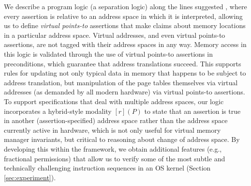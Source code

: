 We describe a program logic (a separation logic) along the lines suggested , where every assertion is relative
to an address space in which it is interpreted, allowing us to define \emph{virtual points-to} assertions that make claims
about memory locations in a particular address space. Virtual addresses, and even virtual points-to assertions, 
are not tagged with their address spaces in any way. Memory access in this logic is validated through the use
of virtual points-to assertions in preconditions, which guarantee that address translations succeed.
This supports rules for updating not only typical data in memory that happens to be subject to address translation, but 
manipulation of the page tables themselves via virtual addresses (as demanded by all modern hardware) 
via virtual points-to assertions.
To support specifications that deal with multiple address spaces, our logic incorporates a hybrid-style modality
$[r](P)$ to state that an assertion is true in another (assertion-specified) address space rather than the address space
currently active in hardware, which is not only useful for virtual memory manager invariants, but  critical to reasoning
about change of address space.
By developing this within the \iris framework, we obtain additional features (e.g., fractional permissions) that allow us to verify
some of the most subtle and technically challenging instruction sequences in an OS kernel (Section \ref{sec:experiment}).



